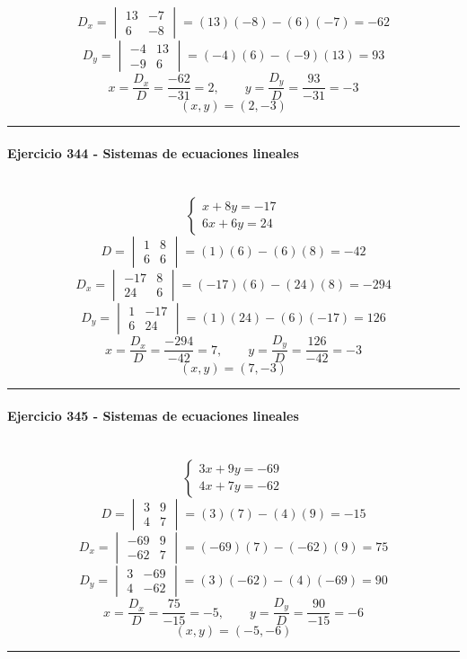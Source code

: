 \documentclass[10pt,a4paper]{article}
\newcommand{\res}[1]{\paragraph{#1}\mbox{}\\[-1.2em]}
\begin{document}
\[ D_x=\begin{vmatrix}13&-7\\6&-8\end{vmatrix}=(13)(-8)-(6)(-7)=-62 \]
\[ D_y=\begin{vmatrix}-4&13\\-9&6\end{vmatrix}=(-4)(6)-(-9)(13)=93 \]
\[ x=\frac{D_x}{D}=\frac{-62}{-31}=2,\qquad y=\frac{D_y}{D}=\frac{93}{-31}=-3 \]
\[ \boxed{(x,y)=(2,-3)} \]
\vspace{1mm}\hrule\vspace{2mm}
\res{Ejercicio 344 - Sistemas de ecuaciones lineales}
\[ \begin{cases}x + 8 y=-17\\6 x + 6 y=24\end{cases} \]
\[ D=\begin{vmatrix}1&8\\6&6\end{vmatrix}=(1)(6)-(6)(8)=-42 \]
\[ D_x=\begin{vmatrix}-17&8\\24&6\end{vmatrix}=(-17)(6)-(24)(8)=-294 \]
\[ D_y=\begin{vmatrix}1&-17\\6&24\end{vmatrix}=(1)(24)-(6)(-17)=126 \]
\[ x=\frac{D_x}{D}=\frac{-294}{-42}=7,\qquad y=\frac{D_y}{D}=\frac{126}{-42}=-3 \]
\[ \boxed{(x,y)=(7,-3)} \]
\vspace{1mm}\hrule\vspace{2mm}
\res{Ejercicio 345 - Sistemas de ecuaciones lineales}
\[ \begin{cases}3 x + 9 y=-69\\4 x + 7 y=-62\end{cases} \]
\[ D=\begin{vmatrix}3&9\\4&7\end{vmatrix}=(3)(7)-(4)(9)=-15 \]
\[ D_x=\begin{vmatrix}-69&9\\-62&7\end{vmatrix}=(-69)(7)-(-62)(9)=75 \]
\[ D_y=\begin{vmatrix}3&-69\\4&-62\end{vmatrix}=(3)(-62)-(4)(-69)=90 \]
\[ x=\frac{D_x}{D}=\frac{75}{-15}=-5,\qquad y=\frac{D_y}{D}=\frac{90}{-15}=-6 \]
\[ \boxed{(x,y)=(-5,-6)} \]
\vspace{1mm}\hrule\vspace{2mm}
\end{document}
